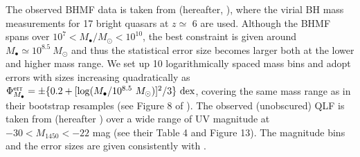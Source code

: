 \documentclass[twocolumn, twocolappendix]{aastex63}
\newcommand{\Msun}{M_\odot}
\newcommand{\Mbh}{M_\bullet}
\newcommand{\Muv}{M_{1450}}
\begin{document}
\begin{CJK*}{UTF8}{gbsn}
The observed BHMF data is taken from \citet{2010AJ....140..546W} (hereafter, ), where 
the virial BH mass measurements for 17 bright quasars at $z\simeq $ 6 are used.
Although the BHMF spans over $10^7 < \Mbh/\Msun <10^{10}$, the best constraint is given around 
$\Mbh \simeq 10^{8.5}~\Msun$
and thus the statistical error size becomes larger both at the lower and higher mass range.
We set up 10 logarithmically spaced mass bins and adopt errors with sizes increasing quadratically as 
$\Phi_{\Mbh}^{\rm err} = \pm \{0.2 +   [\log (\Mbh/10^{8.5}~\Msun)]^2/3 \}~{\rm dex}$,
covering the same mass range as in their bootstrap resamples (see Figure 8 of ). 
The observed (unobscured) QLF is taken from \citet{2018ApJ...869..150M} (hereafter ) 
over a wide range of UV magnitude at $-30 < \Muv <-22$ mag (see their Table 4 and Figure 13). 
The magnitude bins and the error sizes are given consistently with .

  


\end{CJK*}
\end{document}

